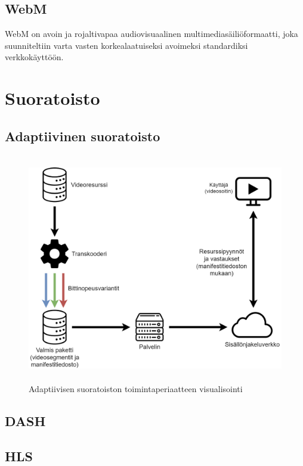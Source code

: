 \documentclass[finnish, 12pt, a4paper, elec, utf8, a-1b, online]{aaltothesis}
\begin{document}
\subsection*{WebM}

WebM on avoin ja rojaltivapaa audiovisuaalinen multimediasäiliöformaatti, joka suunniteltiin varta vasten korkealaatuiseksi avoimeksi standardiksi verkkokäyttöön. \cite{WebM}

\noindent

\clearpage


\section{Suoratoisto}



\subsection*{Adaptiivinen suoratoisto}

\begin{figure}[htb]
  \centering
  \includegraphics[height=10cm]{./img/abr-streaming.png}
  \caption{Adaptiivisen suoratoiston toimintaperiaatteen visualisointi \label{kuva3}}
\end{figure}

\subsection*{DASH}


\subsection*{HLS}
\end{document}
